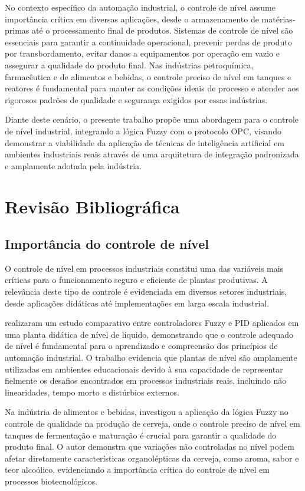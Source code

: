 No contexto específico da automação industrial, o controle de nível assume importância crítica em diversas aplicações, desde o armazenamento de matérias-primas até o processamento final de produtos. Sistemas de controle de nível são essenciais para garantir a continuidade operacional, prevenir perdas de produto por transbordamento, evitar danos a equipamentos por operação em vazio e assegurar a qualidade do produto final. Nas indústrias petroquímica, farmacêutica e de alimentos e bebidas, o controle preciso de nível em tanques e reatores é fundamental para manter as condições ideais de processo e atender aos rigorosos padrões de qualidade e segurança exigidos por essas indústrias.

Diante deste cenário, o presente trabalho propõe uma abordagem para o controle de nível industrial, integrando a lógica Fuzzy com o protocolo OPC, visando demonstrar a viabilidade da aplicação de técnicas de inteligência artificial em ambientes industriais reais através de uma arquitetura de integração padronizada e amplamente adotada pela indústria.

\section{Revisão Bibliográfica}
\label{sec:revbibli}

\subsection{Importância do controle de nível}
\label{sec:importancenivel}
O controle de nível em processos industriais constitui uma das variáveis mais críticas para o funcionamento seguro e eficiente de plantas produtivas. A relevância deste tipo de controle é evidenciada em diversos setores industriais, desde aplicações didáticas até implementações em larga escala industrial.

\cite{bacovis2016} realizaram um estudo comparativo entre controladores Fuzzy e PID aplicados em uma planta didática de nível de líquido, demonstrando que o controle adequado de nível é fundamental para o aprendizado e compreensão dos princípios de automação industrial. O trabalho evidencia que plantas de nível são amplamente utilizadas em ambientes educacionais devido à sua capacidade de representar fielmente os desafios encontrados em processos industriais reais, incluindo não linearidades, tempo morto e distúrbios externos.

Na indústria de alimentos e bebidas, \cite{gomes2022} investigou a aplicação da lógica Fuzzy no controle de qualidade na produção de cerveja, onde o controle preciso de nível em tanques de fermentação e maturação é crucial para garantir a qualidade do produto final. O autor demonstra que variações não controladas no nível podem afetar diretamente características organolépticas da cerveja, como aroma, sabor e teor alcoólico, evidenciando a importância crítica do controle de nível em processos biotecnológicos.

